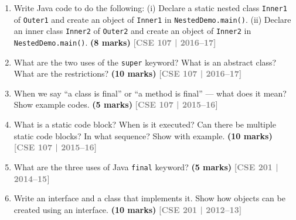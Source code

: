\documentclass[12pt,a3paper]{article}
\newcommand{\yr}[1]{\hfill\textcolor{gray}{\small\textbf{[#1]}}}
\newcommand{\mk}[1]{\textcolor{orange!70!black}{\small\textbf{(#1 marks)}}}
\begin{document}
\begin{enumerate}



\item Write Java code to do the following: (i) Declare a static nested class \texttt{Inner1} of \texttt{Outer1} and create an object of \texttt{Inner1} in \texttt{NestedDemo.main()}. (ii) Declare an inner class \texttt{Inner2} of \texttt{Outer2} and create an object of \texttt{Inner2} in \texttt{NestedDemo.main()}. \mk{8}
\yr{CSE 107 | 2016--17}




\item What are the two uses of the \texttt{super} keyword? What is an abstract class? What are the restrictions? \mk{10}
\yr{CSE 107 | 2016--17}










\item When we say ``a class is final'' or ``a method is final'' --- what does it mean? Show example codes. \mk{5}
\yr{CSE 107 | 2015--16}




\item What is a static code block? When is it executed? Can there be multiple static code blocks? In what sequence? Show with example. \mk{10}
\yr{CSE 107 | 2015--16}




\item What are the three uses of Java \texttt{final} keyword? \mk{5}
\yr{CSE 201 | 2014--15}






\item Write an interface and a class that implements it. Show how objects can be created using an interface. \mk{10}
\yr{CSE 201 | 2012--13}


\end{enumerate}
\end{document}
